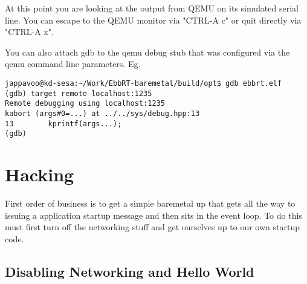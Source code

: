\documentclass[11pt]{report}
\begin{document}
At this point you are looking at the output from QEMU on its simulated serial line.  You can escape to the QEMU monitor via "CTRL-A c" or quit directly via "CTRL-A x".  

You can also attach gdb to the qemu debug stub that was configured via the qemu command line parameters.
Eg.
\begin{verbatim}
jappavoo@kd-sesa:~/Work/EbbRT-baremetal/build/opt$ gdb ebbrt.elf
(gdb) target remote localhost:1235
Remote debugging using localhost:1235
kabort (args#0=...) at ../../sys/debug.hpp:13
13        kprintf(args...);
(gdb) 
\end{verbatim}

\chapter{Hacking}

First order of business is to get a simple baremetal
up that gets all the way to issuing a application
startup message and then sits in the event loop.
To do this must first turn off the networking stuff
and get ourselves up to our own startup code.

\section{Disabling Networking and Hello World}

 
\end{document}
